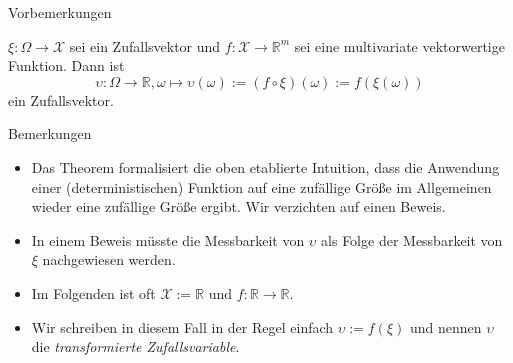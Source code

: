 \documentclass[
  8pt,
  ignorenonframetext,
]{beamer}
\providecommand{\tightlist}{%
  \setlength{\itemsep}{0pt}\setlength{\parskip}{0pt}}
\newcommand{\ups}{\upsilon}
\begin{document}
\begin{frame}{Vorbemerkungen}
\protect\hypertarget{vorbemerkungen-6}{}
\footnotesize
\begin{theorem}
\normalfont
\justifying
$\xi : \Omega \to \mathcal{X}$ sei ein Zufallsvektor und $f:\mathcal{X} \to \mathbb{R}^m$ 
sei eine multivariate vektorwertige Funktion. Dann ist
\begin{equation}
\ups : \Omega \to \mathbb{R}, \omega \mapsto \ups(\omega) := (f \circ \xi)(\omega) := f(\xi(\omega))
\end{equation}
ein Zufallsvektor.
\end{theorem}

Bemerkungen

\begin{itemize}
\tightlist
\item
  \justifying Das Theorem formalisiert die oben etablierte Intuition,
  dass die Anwendung einer (deterministischen) Funktion auf eine
  zufällige Größe im Allgemeinen wieder eine zufällige Größe ergibt. Wir
  verzichten auf einen Beweis.
\item
  In einem Beweis müsste die Messbarkeit von \(\ups\) als Folge der
  Messbarkeit von \(\xi\) nachgewiesen werden.
\item
  Im Folgenden ist oft \(\mathcal{X} := \mathbb{R}\) und
  \(f : \mathbb{R} \to \mathbb{R}\).
\item
  Wir schreiben in diesem Fall in der Regel einfach \(\ups := f(\xi)\)
  und nennen \(\ups\) die \emph{transformierte Zufallsvariable}.
\end{itemize}
\end{frame}
\end{document}
